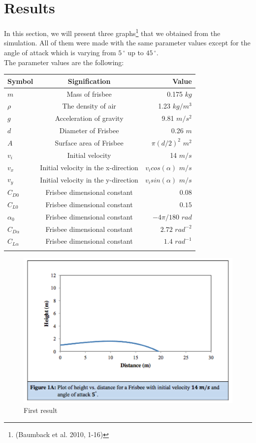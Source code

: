 \documentclass[10pt,a4paper]{report}
\begin{document}
\section{Results}
In this section, we will present three graphs\footnote{(Baumback et al. 2010, 1-16)} that we obtained from the simulation. All of them were made with the same parameter values except for the angle of attack which is varying from $5\,^{\circ}$ up to $45\,^{\circ} $. 
\\The parameter values are the following:
\\
\begin{center}
\begin{tabular}{|l|c|r|}
  \hline
  Symbol & Signification & Value \\
  \hline
  $m$ & Mass of frisbee & 0.175 $kg$\\
  $\rho$ & The density of air & 1.23 $kg/m^3$\\
  $g$ & Acceleration of gravity & 9.81 $m/s^2$ \\
  $d$ & Diameter of Frisbee & 0.26 $m$ \\
  $A$ & Surface area of Frisbee & $\pi (d/2)^2$ $m^2$ \\
  $v_i$ & Initial velocity & 14 $m/s$ \\
  $v_x$ & Initial velocity in the x-direction & $v_icos(\alpha)$ $m/s$ \\
  $v_y$ & Initial velocity in the y-direction & $v_isin(\alpha)$ $m/s$ \\
  $C_{D0}$ & Frisbee dimensional constant & $0.08$ \\
  $C_{L0}$ & Frisbee dimensional constant & $0.15$ \\
  $\alpha_0$ & Frisbee dimensional constant & $-4\pi / 180$ $rad$ \\
  $C_{D\alpha}$ & Frisbee dimensional constant & $2.72$ $rad^{-2}$\\
  $C_{L\alpha}$ & Frisbee dimensional constant & $1.4 $ $rad^{-1}$\\
  \\
  \hline
\end{tabular}
\end{center}
\begin{figure}[H]
 \centering
\includegraphics[scale=0.6]{graph1.jpg}
\caption{First result}
\label{First result}
\end{figure}
\end{document}
